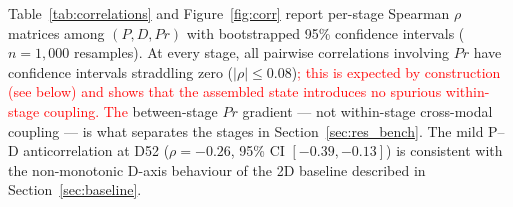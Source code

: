 \documentclass[5p,times,twocolumn]{elsarticle}
\newcommand{\rtag}[1]{}
\newcommand{\rev}[2]{\rtag{#1}\textcolor{red}{#2}}
\begin{document}
\begin{table}[!htbp]
  \caption{%
    Trajectory coherence
    $C^{(i)} = \cos(\mathbf{s}_{30} - \mathbf{s}_{11},\;
  \mathbf{s}_{52} - \mathbf{s}_{30})$, reported as a structural
    sanity check ($n = 200$ trajectories). The stochastic-$Pr$
    row is the meaningful one; the deterministic-$Pr$ row reaches
    the $+1$ ceiling by construction because $Pr$ is monotone
    across stages.}
  \label{tab:coherence}
  \centering
\end{table}

Table~\ref{tab:correlations} and Figure~\ref{fig:corr} report
per-stage Spearman $\rho$ matrices among $(P, D, Pr)$ with
bootstrapped 95\% confidence intervals ($n = 1{,}000$ resamples).
At every stage, all pairwise correlations involving $Pr$ have
confidence intervals straddling zero ($|\rho| \leq 0.08$)\rev{AC}{;
  this is expected by construction (see below) and shows that the
  assembled state introduces no spurious within-stage coupling.
  The} between-stage $Pr$ gradient --- not
within-stage cross-modal coupling --- is what separates the
stages in Section~\ref{sec:res_bench}.
The mild P--D anticorrelation at D52 ($\rho = -0.26$,
95\% CI $[-0.39, -0.13]$) is consistent with the non-monotonic
D-axis behaviour of the 2D baseline described in
Section~\ref{sec:baseline}.
\end{document}

